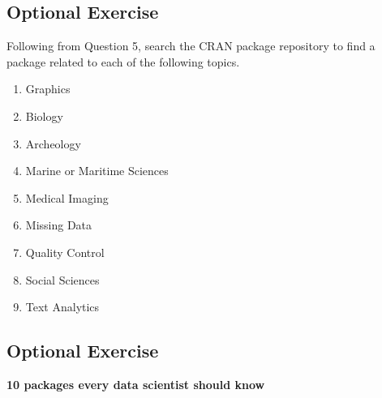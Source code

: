 \documentclass[12pt]{article}
\begin{document}
\newpage
\subsection*{Optional Exercise}
Following from Question 5, search the CRAN package repository to find a package 
related to each of the following topics.
\begin{enumerate}
\item Graphics
\item Biology
\item Archeology
\item Marine or Maritime Sciences
\item Medical Imaging
\item Missing Data
\item Quality Control
\item Social Sciences
\item Text Analytics
\end{enumerate}

\newpage
\subsection*{Optional Exercise}

\textbf{10 packages every data scientist should know}
\end{document}
